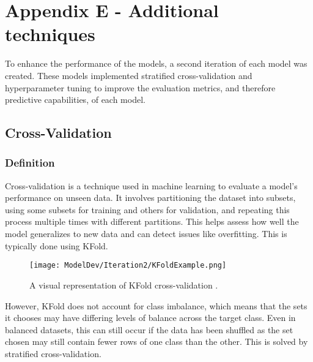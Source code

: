 \begingroup
\renewcommand\thechapter{E}
\titleformat{\chapter}[display]
{\normalfont\huge\bfseries}{}{20pt}{\Huge}
\setcounter{section}{0} %

\chapter*{Appendix E - Additional techniques}

To enhance the performance of the models, a second iteration of each model was created.
These models implemented stratified cross-validation and hyperparameter tuning to improve 
the evaluation metrics, and therefore predictive capabilities, of each model.

\section{Cross-Validation}
\subsection{Definition}
Cross-validation is a technique used in machine learning to evaluate a model's performance on unseen data. It involves 
partitioning the dataset into subsets, using some subsets for training and others for validation, and repeating this
process multiple times with different partitions. This helps assess how well the model generalizes to new data and can
detect issues like overfitting. This is typically done using KFold.

\begin{figure}[H]
    \centering 
    \texttt{[image: ModelDev/Iteration2/KFoldExample.png]}
    \caption{A visual representation of KFold cross-validation \autocite{rosaen_scikit-learn_nodate}.}
    \label{fig:KFExample}
\end{figure}

\para However, KFold does not account for class imbalance, which means that the sets it chooses may have 
differing levels of balance across the target class. Even in balanced datasets, this can still occur if the 
data has been shuffled as the set chosen may still contain fewer rows of one class than the other. This is 
solved by stratified cross-validation.

